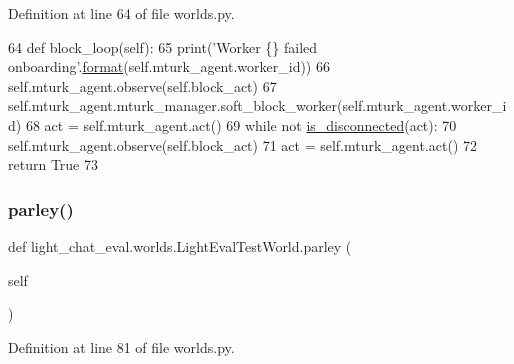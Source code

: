 Definition at line 64 of file worlds.\+py.


\begin{DoxyCode}
64     \textcolor{keyword}{def }block\_loop(self):
65         print(\textcolor{stringliteral}{'Worker \{\} failed onboarding'}.\hyperlink{namespaceparlai_1_1chat__service_1_1services_1_1messenger_1_1shared__utils_a32e2e2022b824fbaf80c747160b52a76}{format}(self.mturk\_agent.worker\_id))
66         self.mturk\_agent.observe(self.block\_act)
67         self.mturk\_agent.mturk\_manager.soft\_block\_worker(self.mturk\_agent.worker\_id)
68         act = self.mturk\_agent.act()
69         \textcolor{keywordflow}{while} \textcolor{keywordflow}{not} \hyperlink{namespacelight__chats_1_1worlds_a43b0aff73307cda95a089763b77f40d3}{is\_disconnected}(act):
70             self.mturk\_agent.observe(self.block\_act)
71             act = self.mturk\_agent.act()
72         \textcolor{keywordflow}{return} \textcolor{keyword}{True}
73 
\end{DoxyCode}
\mbox{\label{classlight__chat__eval_1_1worlds_1_1LightEvalTestWorld_a1cf2385dcf048fff5a7e74b19f8c6917}} 
\subsubsection{\texorpdfstring{parley()}{parley()}}
{\footnotesize\ttfamily def light\+\_\+chat\+\_\+eval.\+worlds.\+Light\+Eval\+Test\+World.\+parley (\begin{DoxyParamCaption}\item[{}]{self }\end{DoxyParamCaption})}



Definition at line 81 of file worlds.\+py.


